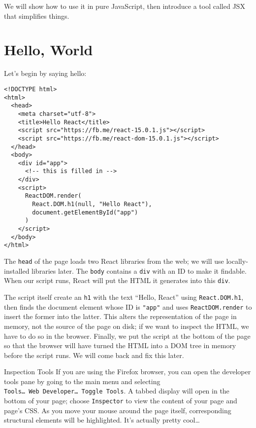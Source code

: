 We will show how to use it in pure JavaScript,
then introduce a tool called JSX that simplifies things.

\section{Hello, World}\label{s:dynamic-hello}

Let's begin by saying hello:

\begin{verbatim}
<!DOCTYPE html>
<html>
  <head>
    <meta charset="utf-8">
    <title>Hello React</title>
    <script src="https://fb.me/react-15.0.1.js"></script>
    <script src="https://fb.me/react-dom-15.0.1.js"></script>
  </head>
  <body>
    <div id="app">
      <!-- this is filled in -->
    </div>
    <script>
      ReactDOM.render(
        React.DOM.h1(null, "Hello React"),
        document.getElementById("app")
      )
    </script>
  </body>
</html>
\end{verbatim}

The \texttt{head} of the page loads two React libraries from the web;
we will use locally-installed libraries later.
The \texttt{body} contains a \texttt{div} with an ID to make it findable.
When our script runs,
React will put the HTML it generates into this \texttt{div}.

The script itself create an \texttt{h1} with the text ``Hello, React'' using \texttt{React.DOM.h1},
then finds the document element whose ID is \texttt{"app"}
and uses \texttt{ReactDOM.render} to insert the former into the latter.
This alters the representation of the page in memory,
not the source of the page on disk;
if we want to inspect the HTML,
we have to do so in the browser.
Finally,
we put the script at the bottom of the page
so that the browser will have turned the HTML into a DOM tree in memory
before the script runs.
We will come back and fix this later.

\begin{aside}{Inspection Tools}
  If you are using the Firefox browser,
  you can open the developer tools pane by going to the main menu
  and selecting \texttt{Tools{\ldots}\ Web\ Developer{\ldots}\ Toggle\ Tools}.
  A tabbed display will open in the bottom of your page;
  choose \texttt{Inspector} to view the content of your page and page's CSS.
  As you move your mouse around the page itself,
  corresponding structural elements will be highlighted.
  It's actually pretty cool{\ldots}
\end{aside}

